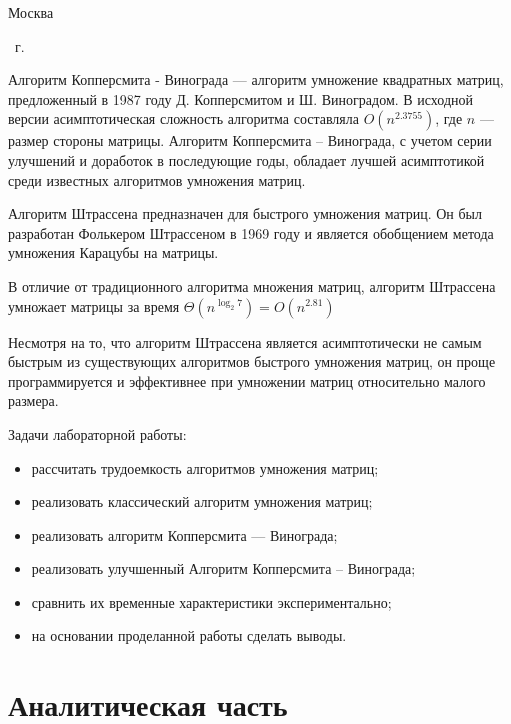 \begin{center}
	\mbox{}
	\vfill
	Москва
\end{center}

\begin{center}
	\the\year ~г.
\end{center}
\clearpage

\renewcommand\contentsname{\hfill{\normalfont{СОДЕРЖАНИЕ}}\hfill}  %
\tableofcontents
\newpage


Алгоритм Копперсмита - Винограда --- алгоритм умножение квадратных матриц, предложенный в 1987 году Д. Копперсмитом и Ш. Виноградом. В исходной версии асимптотическая сложность алгоритма составляла $O(n^{2.3755})$, где $n$ --- размер стороны матрицы. Алгоритм Копперсмита -- Винограда, с учетом серии улучшений и доработок в последующие годы, обладает лучшей асимптотикой среди известных алгоритмов умножения матриц.


Алгоритм Штрассена предназначен для быстрого умножения матриц. Он был разработан Фолькером Штрассеном в 1969 году и является обобщением метода умножения Карацубы на матрицы.

В отличие от традиционного алгоритма множения матриц, алгоритм Штрассена умножает матрицы за время $\Theta(n^{\log_2{7}}) = O(n^{2.81})$

Несмотря на то, что алгоритм Штрассена является асимптотически не самым быстрым из существующих алгоритмов быстрого умножения матриц, он проще программируется и эффективнее при умножении матриц относительно малого размера.

Задачи лабораторной работы:

\begin{itemize}
    \item рассчитать трудоемкость алгоритмов умножения матриц;
    \item реализовать классический алгоритм умножения матриц;
    \item реализовать алгоритм Копперсмита — Винограда;
    \item реализовать улучшенный Алгоритм Копперсмита -- Винограда;
    \item сравнить их временные характеристики экспериментально;
    \item на основании проделанной работы сделать выводы.
\end{itemize}

\section{Аналитическая часть}

